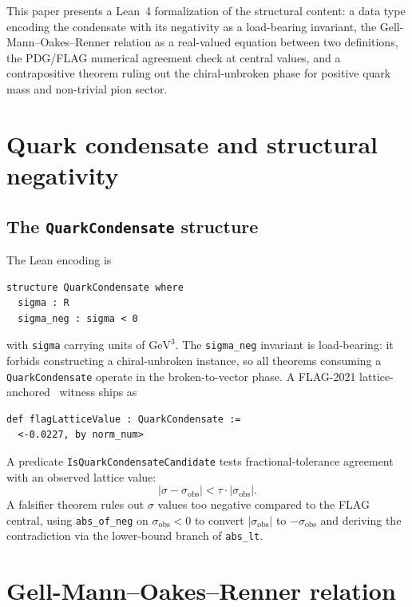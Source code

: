 \documentclass[twocolumn]{revtex4-2}
\begin{document}
This paper presents a Lean~4 formalization of the structural content:
a data type encoding the condensate with its negativity as a
load-bearing invariant, the Gell-Mann--Oakes--Renner relation as a
real-valued equation between two definitions, the PDG/FLAG numerical
agreement check at central values, and a contrapositive theorem
ruling out the chiral-unbroken phase for positive quark mass and
non-trivial pion sector.

\section{Quark condensate and structural negativity}
\label{sec:quarkCondensate}

\subsection{The \texttt{QuarkCondensate} structure}

The Lean encoding is
\begin{verbatim}
structure QuarkCondensate where
  sigma : R
  sigma_neg : sigma < 0
\end{verbatim}
with \texttt{sigma} carrying units of $\mathrm{GeV}^3$. The
\texttt{sigma\_neg} invariant is load-bearing: it forbids constructing
a chiral-unbroken instance, so all theorems consuming a
\texttt{QuarkCondensate} operate in the broken-to-vector phase. A
FLAG-2021 lattice-anchored~\cite{FLAG2021} witness ships as
\begin{verbatim}
def flagLatticeValue : QuarkCondensate :=
  <-0.0227, by norm_num>
\end{verbatim}

A predicate \texttt{IsQuarkCondensateCandidate} tests
fractional-tolerance agreement with an observed lattice value:
\begin{equation}
|\sigma - \sigma_{\mathrm{obs}}| < \tau \cdot |\sigma_{\mathrm{obs}}|.
\end{equation}
A falsifier theorem rules out $\sigma$ values too negative compared to
the FLAG central, using \texttt{abs\_of\_neg} on
$\sigma_{\mathrm{obs}} < 0$ to convert
$|\sigma_{\mathrm{obs}}|$ to $-\sigma_{\mathrm{obs}}$ and deriving the
contradiction via the lower-bound branch of \texttt{abs\_lt}.

\section{Gell-Mann--Oakes--Renner relation}
\label{sec:gmor}
\end{document}
